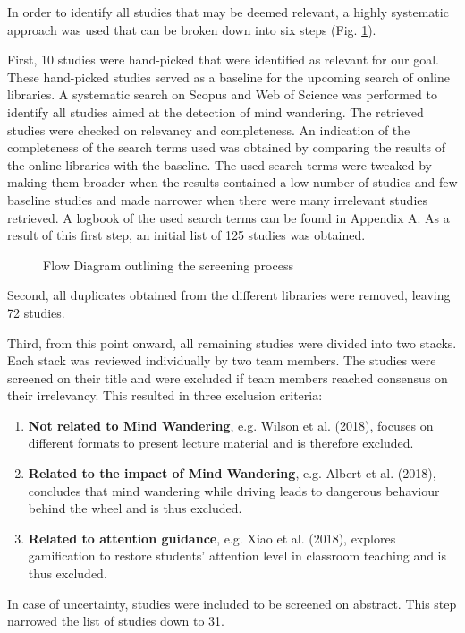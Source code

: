 
In order to identify all studies that may be deemed relevant, a highly systematic approach was used that can be broken down into six steps (Fig. \ref{fig:prisma}).

First, 10 studies were hand-picked that were identified as relevant for our goal. These hand-picked studies served as a baseline for the upcoming search of online libraries.
A systematic search on Scopus and Web of Science was performed to identify all studies aimed at the detection of mind wandering. The retrieved studies were checked on relevancy and completeness.
An indication of the completeness of the search terms used was obtained by comparing the results of the online libraries with the baseline. 
The used search terms were tweaked by making them broader when the results contained a low number of studies and few baseline studies and made narrower when there were many irrelevant studies retrieved.
A logbook of the used search terms can be found in Appendix A.
As a result of this first step, an initial list of 125 studies was obtained.

\begin{figure}
  \resizebox{\columnwidth}{!}{}
\caption{Flow Diagram outlining the screening process}
\label{fig:prisma}
\end{figure}

Second, all duplicates obtained from the different libraries were removed, leaving 72 studies.

Third, from this point onward, all remaining studies were divided into two stacks. Each stack was reviewed individually by two team members.
The studies were screened on their title and were excluded if team members reached consensus on their irrelevancy. 
This resulted in three exclusion criteria:
\begin{enumerate}
    \item \textbf{Not related to Mind Wandering}, e.g. Wilson et al. (2018), focuses on different formats to present lecture material \cite{ISI:000432512400017} and is therefore excluded.
    \item \textbf{Related to the impact of Mind Wandering}, e.g. Albert et al. (2018), concludes that mind wandering while driving leads to dangerous behaviour behind the wheel \cite{Albert2018LinkingDrivers} and is thus excluded.
    \item \textbf{Related to attention guidance}, e.g. Xiao et al. (2018), explores gamification to restore students' attention level in classroom teaching \cite{Xiao2018ClassroomMechanism} and is thus excluded.
  \end{enumerate}
In case of uncertainty, studies were included to be screened on abstract. This step narrowed the list of studies down to 31.

